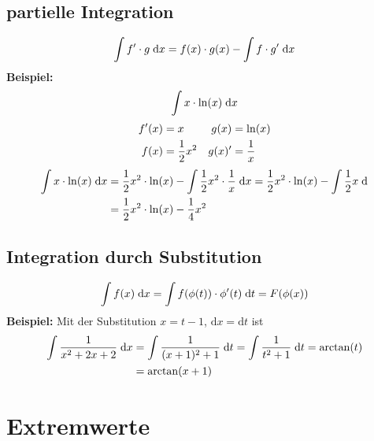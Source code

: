 \documentclass[ngerman,a4paper]{article}
\begin{document}
\subsection{partielle Integration}
\begin{align}
	\int f'\cdot g\;\mathrm{d}x=f(x)\cdot g(x)-\int f\cdot g'\;\mathrm{d}x\notag
\end{align}
\textbf{Beispiel:} 
\begin{align}
	\int x\cdot \ln(x) \;\mathrm{d}x\notag
\end{align}
\begin{align}
	f'(x) &= x & g(x) &= \ln(x) \notag \\
	f(x) &= \frac{1}{2}x^2 & g(x)' &= \frac{1}{x}\notag
\end{align}
\begin{align}
	\int x\cdot \ln(x) \;\mathrm{d}x &= \frac{1}{2}x^2\cdot\ln(x)-\int \frac{1}{2}x^2\cdot\frac{1}{x}\;\mathrm{d}x = \frac{1}{2}x^2\cdot\ln(x)-\int \frac{1}{2}x\;\mathrm{d} \notag \\
	&= \frac{1}{2}x^2\cdot\ln(x)-\frac{1}{4}x^2\notag
\end{align}

\subsection{Integration durch Substitution}
\begin{align}
	\int f(x)\;\mathrm{d}x = \int f(\phi(t))\cdot\phi'(t)\;\mathrm{d}t=F(\phi(x))\notag
\end{align}
\textbf{Beispiel:} Mit der Substitution $x=t-1$, $\mathrm{d}x=\mathrm{d}t$ ist
\begin{align}
	\int\frac{1}{x^2+2x+2}\;\mathrm{d}x &= \int\frac{1}{(x+1)^2+1}\;\mathrm{d}t = \int\frac{1}{t^2+1}\;\mathrm{d}t = \arctan(t) \notag \\
	&= \arctan(x+1)\notag
\end{align}

\section{Extremwerte}
\end{document}
